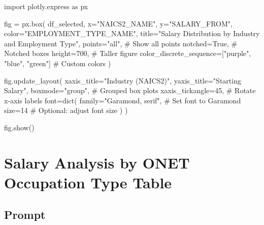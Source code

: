 \documentclass[
  letterpaper,
  DIV=11,
  numbers=noendperiod]{scrartcl}
\newenvironment{Shaded}{\begin{snugshade}}{\end{snugshade}}
\newcommand{\BuiltInTok}[1]{\textcolor[rgb]{0.00,0.23,0.31}{#1}}
\newcommand{\CommentTok}[1]{\textcolor[rgb]{0.37,0.37,0.37}{#1}}
\newcommand{\DecValTok}[1]{\textcolor[rgb]{0.68,0.00,0.00}{#1}}
\newcommand{\ImportTok}[1]{\textcolor[rgb]{0.00,0.46,0.62}{#1}}
\newcommand{\NormalTok}[1]{\textcolor[rgb]{0.00,0.23,0.31}{#1}}
\newcommand{\OperatorTok}[1]{\textcolor[rgb]{0.37,0.37,0.37}{#1}}
\newcommand{\StringTok}[1]{\textcolor[rgb]{0.13,0.47,0.30}{#1}}
\newcommand{\VariableTok}[1]{\textcolor[rgb]{0.07,0.07,0.07}{#1}}
\begin{document}
\begin{Shaded}
\begin{Highlighting}[]
\ImportTok{import}\NormalTok{ plotly.express }\ImportTok{as}\NormalTok{ px}

\NormalTok{fig }\OperatorTok{=}\NormalTok{ px.box(}
\NormalTok{    df\_selected,}
\NormalTok{    x}\OperatorTok{=}\StringTok{"NAICS2\_NAME"}\NormalTok{,}
\NormalTok{    y}\OperatorTok{=}\StringTok{"SALARY\_FROM"}\NormalTok{,}
\NormalTok{    color}\OperatorTok{=}\StringTok{"EMPLOYMENT\_TYPE\_NAME"}\NormalTok{,}
\NormalTok{    title}\OperatorTok{=}\StringTok{"Salary Distribution by Industry and Employment Type"}\NormalTok{,}
\NormalTok{    points}\OperatorTok{=}\StringTok{"all"}\NormalTok{,  }\CommentTok{\# Show all points}
\NormalTok{    notched}\OperatorTok{=}\VariableTok{True}\NormalTok{,  }\CommentTok{\# Notched boxes}
\NormalTok{    height}\OperatorTok{=}\DecValTok{700}\NormalTok{,  }\CommentTok{\# Taller figure}
\NormalTok{    color\_discrete\_sequence}\OperatorTok{=}\NormalTok{[}\StringTok{"purple"}\NormalTok{, }\StringTok{"blue"}\NormalTok{, }\StringTok{"green"}\NormalTok{]  }\CommentTok{\# Custom colors}
\NormalTok{)}

\NormalTok{fig.update\_layout(}
\NormalTok{    xaxis\_title}\OperatorTok{=}\StringTok{"Industry (NAICS2)"}\NormalTok{,}
\NormalTok{    yaxis\_title}\OperatorTok{=}\StringTok{"Starting Salary"}\NormalTok{,}
\NormalTok{    boxmode}\OperatorTok{=}\StringTok{"group"}\NormalTok{,  }\CommentTok{\# Grouped box plots}
\NormalTok{    xaxis\_tickangle}\OperatorTok{=}\DecValTok{45}\NormalTok{,  }\CommentTok{\# Rotate x{-}axis labels}
\NormalTok{    font}\OperatorTok{=}\BuiltInTok{dict}\NormalTok{(}
\NormalTok{        family}\OperatorTok{=}\StringTok{"Garamond, serif"}\NormalTok{,  }\CommentTok{\# Set font to Garamond}
\NormalTok{        size}\OperatorTok{=}\DecValTok{14}  \CommentTok{\# Optional: adjust font size}
\NormalTok{    )}
\NormalTok{)}

\NormalTok{fig.show()}
\end{Highlighting}
\end{Shaded}

\section{Salary Analysis by ONET Occupation Type
Table}\label{salary-analysis-by-onet-occupation-type-table}

\subsection{Prompt}\label{prompt-2}
\end{document}
